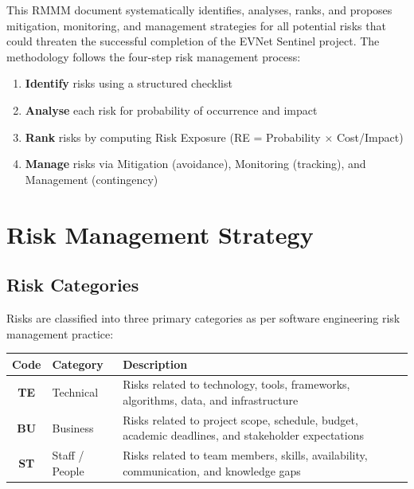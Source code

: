 \documentclass[11pt, a4paper]{article}
\begin{document}
\begin{infobox}
This RMMM document systematically identifies, analyses, ranks, and proposes mitigation, monitoring, and management strategies for all potential risks that could threaten the successful completion of the EVNet Sentinel project. The methodology follows the four-step risk management process:
\begin{enumerate}[leftmargin=*]
    \item \textbf{Identify} risks using a structured checklist
    \item \textbf{Analyse} each risk for probability of occurrence and impact
    \item \textbf{Rank} risks by computing Risk Exposure (RE = Probability $\times$ Cost/Impact)
    \item \textbf{Manage} risks via Mitigation (avoidance), Monitoring (tracking), and Management (contingency)
\end{enumerate}
\end{infobox}

\section{Risk Management Strategy}
\label{sec:strategy}

\subsection{Risk Categories}

Risks are classified into three primary categories as per software engineering risk management practice:

\begin{center}
\begin{tabular}{|c|l|p{8.5cm}|}
\hline
\rowcolor{lightgray}
\textbf{Code} & \textbf{Category} & \textbf{Description} \\
\hline
\textbf{TE} & Technical & Risks related to technology, tools, frameworks, algorithms, data, and infrastructure \\
\hline
\textbf{BU} & Business & Risks related to project scope, schedule, budget, academic deadlines, and stakeholder expectations \\
\hline
\textbf{ST} & Staff / People & Risks related to team members, skills, availability, communication, and knowledge gaps \\
\hline
\end{tabular}
\end{center}
\end{document}
